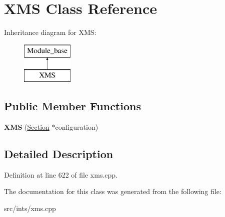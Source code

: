 \hypertarget{classXMS}{\section{X\-M\-S Class Reference}
\label{classXMS}
}
Inheritance diagram for X\-M\-S\-:\begin{figure}[H]
\begin{center}
\leavevmode
\includegraphics[height=2.000000cm]{classXMS}
\end{center}
\end{figure}
\subsection*{Public Member Functions}
\begin{DoxyCompactItemize}
\item 
\hypertarget{classXMS_a09c1f705bac7231151e025c1444f8c2c}{{\bfseries X\-M\-S} (\hyperlink{classSection}{Section} $\ast$configuration)}\label{classXMS_a09c1f705bac7231151e025c1444f8c2c}

\end{DoxyCompactItemize}


\subsection{Detailed Description}


Definition at line 622 of file xms.\-cpp.



The documentation for this class was generated from the following file\-:\begin{DoxyCompactItemize}
\item 
src/ints/xms.\-cpp\end{DoxyCompactItemize}
